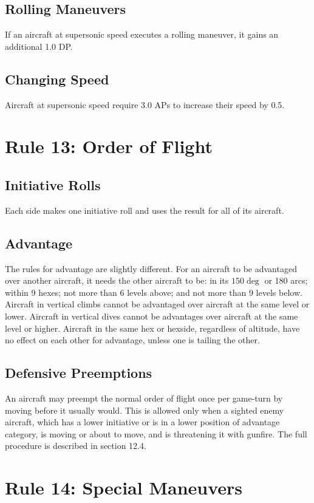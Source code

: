 \documentclass[10pt]{extarticle}
\begin{document}
\subsection{Rolling Maneuvers} If an aircraft at supersonic speed executes a rolling maneuver, it gains an additional 1.0 DP.

\subsection{Changing Speed} Aircraft at supersonic speed require 3.0 APs to increase their speed by 0.5.

\section{Rule 13: Order of Flight}

\subsection{Initiative Rolls} Each side makes one initiative roll and uses the result for all of its aircraft.

\subsection{Advantage} The rules for advantage are slightly different. For an aircraft to be advantaged over another aircraft, it needs the other aircraft to be: in its $150\deg$ or {180\deg} arcs; within 9 hexes; not more than 6 levels above; and not more than 9 levels below. Aircraft in vertical climbs cannot be advantaged over aircraft at the same level or lower. Aircraft in vertical dives cannot be advantages over aircraft at the same level or higher. Aircraft in the same hex or hexside, regardless of altitude, have no effect on each other for advantage, unless one is tailing the other.

\subsection{Defensive Preemptions} An aircraft may preempt the normal order of flight once per game-turn by moving before it usually would. This is allowed only when a sighted enemy aircraft, which has a lower initiative or is in a lower position of advantage category, is moving or about to move, and is threatening it with gunfire. The full procedure is described in section 12.4.

\section{Rule 14: Special Maneuvers}
\end{document}
